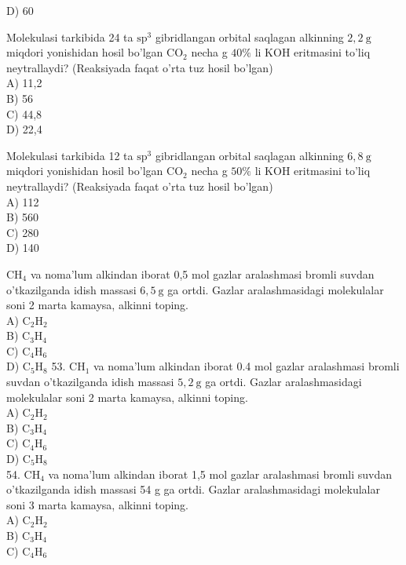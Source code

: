 D) 60
  \item Molekulasi tarkibida 24 ta $\mathrm{sp}^{3}$ gibridlangan orbital saqlagan alkinning $2,2 \mathrm{~g}$ miqdori yonishidan hosil bo'lgan $\mathrm{CO}_{2}$ necha g $40 \%$ li KOH eritmasini to'liq neytrallaydi? (Reaksiyada faqat o'rta tuz hosil bo'lgan)\\
A) 11,2\\
B) 56\\
C) 44,8\\
D) 22,4
  \item Molekulasi tarkibida 12 ta $\mathrm{sp}^{3}$ gibridlangan orbital saqlagan alkinning $6,8 \mathrm{~g}$ miqdori yonishidan hosil bo'lgan $\mathrm{CO}_{2}$ necha g $50 \%$ li KOH eritmasini to'liq neytrallaydi? (Reaksiyada faqat o'rta tuz hosil bo'lgan)\\
A) 112\\
B) 560\\
C) 280\\
D) 140
  \item $\mathrm{CH}_{4}$ va noma'lum alkindan iborat 0,5 mol gazlar aralashmasi bromli suvdan o'tkazilganda idish massasi $6,5 \mathrm{~g}$ ga ortdi. Gazlar aralashmasidagi molekulalar soni 2 marta kamaysa, alkinni toping.\\
A) $\mathrm{C}_{2} \mathrm{H}_{2}$\\
B) $\mathrm{C}_{3} \mathrm{H}_{4}$\\
C) $\mathrm{C}_{4} \mathrm{H}_{6}$\\
D) $\mathrm{C}_{5} \mathrm{H}_{8}$
53. $\mathrm{CH}_{1}$ va noma'lum alkindan iborat 0.4 mol gazlar aralashmasi bromli suvdan o'tkazilganda idish massasi $5,2 \mathrm{~g}$ ga ortdi. Gazlar aralashmasidagi molekulalar soni 2 marta kamaysa, alkinni toping.\\
A) $\mathrm{C}_{2} \mathrm{H}_{2}$\\
B) $\mathrm{C}_{3} \mathrm{H}_{4}$\\
C) $\mathrm{C}_{4} \mathrm{H}_{6}$\\
D) $\mathrm{C}_{5} \mathrm{H}_{8}$\\
54. $\mathrm{CH}_{4}$ va noma'lum alkindan iborat 1,5 mol gazlar aralashmasi bromli suvdan o'tkazilganda idish massasi 54 g ga ortdi. Gazlar aralashmasidagi molekulalar soni 3 marta kamaysa, alkinni toping.\\
A) $\mathrm{C}_{2} \mathrm{H}_{2}$\\
B) $\mathrm{C}_{3} \mathrm{H}_{4}$\\
C) $\mathrm{C}_{4} \mathrm{H}_{6}$\\
